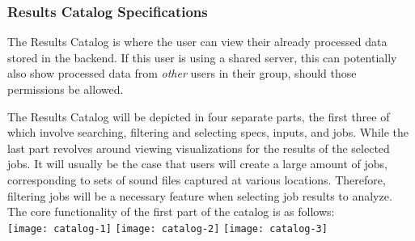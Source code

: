 \subsubsection{Results Catalog Specifications}
The Results Catalog is where the user can view their already processed data stored in the backend. If this user is using a shared server, this can potentially also show processed data from \textit{other} users in their group, should those permissions be allowed.\par
The Results Catalog will be depicted in four separate parts, the first three of which involve searching, filtering and selecting specs, inputs, and jobs. While the last part revolves around viewing visualizations for the results of the selected jobs. It will usually be the case that users will create a large amount of jobs, corresponding to sets of sound files captured at various locations. Therefore, filtering jobs will be a necessary feature when selecting job results to analyze. The core functionality of the first part of the catalog is as follows:\\
\texttt{[image: catalog-1]}
\texttt{[image: catalog-2]}
\texttt{[image: catalog-3]}
